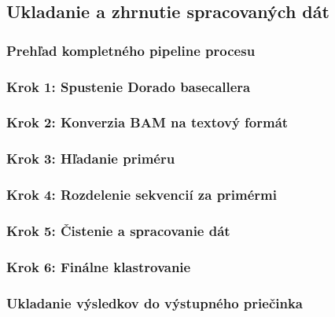 \subsection{Ukladanie a zhrnutie spracovaných dát}

\subsubsection{Prehľad kompletného pipeline procesu}


\subsubsection{Krok 1: Spustenie Dorado basecallera}


\subsubsection{Krok 2: Konverzia BAM na textový formát}


\subsubsection{Krok 3: Hľadanie priméru}


\subsubsection{Krok 4: Rozdelenie sekvencií za primérmi}


\subsubsection{Krok 5: Čistenie a spracovanie dát}


\subsubsection{Krok 6: Finálne klastrovanie}


\subsubsection{Ukladanie výsledkov do výstupného priečinka}

